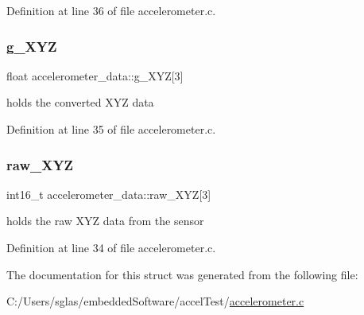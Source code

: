 Definition at line 36 of file accelerometer.\+c.

\mbox{\label{structaccelerometer__data_adb29a615593df0207568aa0fad82d033}} 
\subsubsection{\texorpdfstring{g\_XYZ}{g\_XYZ}}
{\footnotesize\ttfamily float accelerometer\+\_\+data\+::g\+\_\+\+X\+YZ\mbox{[}3\mbox{]}}



holds the converted X\+YZ data 



Definition at line 35 of file accelerometer.\+c.

\mbox{\label{structaccelerometer__data_a30e93e2834f136bd887133f061e97451}} 
\subsubsection{\texorpdfstring{raw\_XYZ}{raw\_XYZ}}
{\footnotesize\ttfamily int16\+\_\+t accelerometer\+\_\+data\+::raw\+\_\+\+X\+YZ\mbox{[}3\mbox{]}}



holds the raw X\+YZ data from the sensor 



Definition at line 34 of file accelerometer.\+c.



The documentation for this struct was generated from the following file\+:\begin{DoxyCompactItemize}
\item 
C\+:/\+Users/sglas/embedded\+Software/accel\+Test/\mbox{\hyperlink{accelerometer_8c}{accelerometer.\+c}}\end{DoxyCompactItemize}
